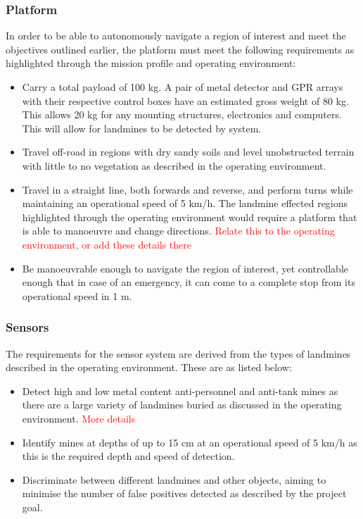 \documentclass[main.tex]{subfiles}
\begin{document}
\subsubsection{Platform}
In order to be able to autonomously navigate a region of interest and meet the objectives outlined earlier, the platform must meet the following requirements as highlighted through the mission profile and operating environment: 
\begin{itemize}
 \item Carry a total payload of 100 kg. A pair of metal detector and GPR arrays with their respective control boxes have an estimated gross weight of 80 kg. This allows 20 kg for any mounting structures,  electronics and computers. This will allow for landmines to be detected by system.
 \item Travel off-road in regions with dry sandy soils and level unobstructed terrain with little to no vegetation as described in the operating environment.
\item Travel in a straight line, both forwards and reverse, and perform turns while maintaining an operational speed of 5 km/h. The landmine effected regions highlighted through the operating environment would require a platform that is able to manoeuvre and change directions.  \textcolor{red}{Relate this to the operating environment, or add these details there}
\item Be manoeuvrable enough to navigate the region of interest, yet controllable enough that in case of an emergency, it can come to a complete stop from its operational speed in 1 m.
\end{itemize}

\subsubsection{Sensors}
The requirements for the sensor system are derived from the types of landmines described in the operating environment. These are as listed below:
\begin{itemize}
\item Detect high and low metal content anti-personnel and anti-tank mines as there are a large variety of landmines buried as discussed in the operating environment. \textcolor{red}{More details}
\item Identify mines at depths of up to 15 cm at an operational speed of 5 km/h as this is the required depth and speed of detection.
\item Discriminate between different landmines and other objects, aiming to minimise the number of false positives detected as described by the project goal.
\end{itemize}
\end{document}
